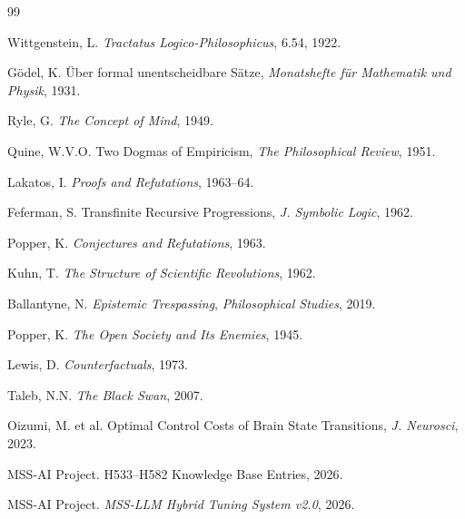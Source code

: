 \documentclass[11pt,a4paper]{article}
\begin{document}
\begin{thebibliography}{99}

Wittgenstein, L.
\emph{Tractatus Logico-Philosophicus}, 6.54, 1922.

G\"odel, K.
\"Uber formal unentscheidbare S\"atze, \emph{Monatshefte f\"ur Mathematik und Physik}, 1931.

Ryle, G.
\emph{The Concept of Mind}, 1949.

Quine, W.V.O.
Two Dogmas of Empiricism, \emph{The Philosophical Review}, 1951.

Lakatos, I.
\emph{Proofs and Refutations}, 1963--64.

Feferman, S.
Transfinite Recursive Progressions, \emph{J. Symbolic Logic}, 1962.

Popper, K.
\emph{Conjectures and Refutations}, 1963.

Kuhn, T.
\emph{The Structure of Scientific Revolutions}, 1962.

Ballantyne, N.
\emph{Epistemic Trespassing}, \emph{Philosophical Studies}, 2019.

Popper, K.
\emph{The Open Society and Its Enemies}, 1945.

Lewis, D.
\emph{Counterfactuals}, 1973.

Taleb, N.N.
\emph{The Black Swan}, 2007.

Oizumi, M. et al.
Optimal Control Costs of Brain State Transitions, \emph{J. Neurosci}, 2023.

MSS-AI Project.
H533--H582 Knowledge Base Entries, 2026.

MSS-AI Project.
\emph{MSS-LLM Hybrid Tuning System v2.0}, 2026.

\end{thebibliography}
\end{document}
